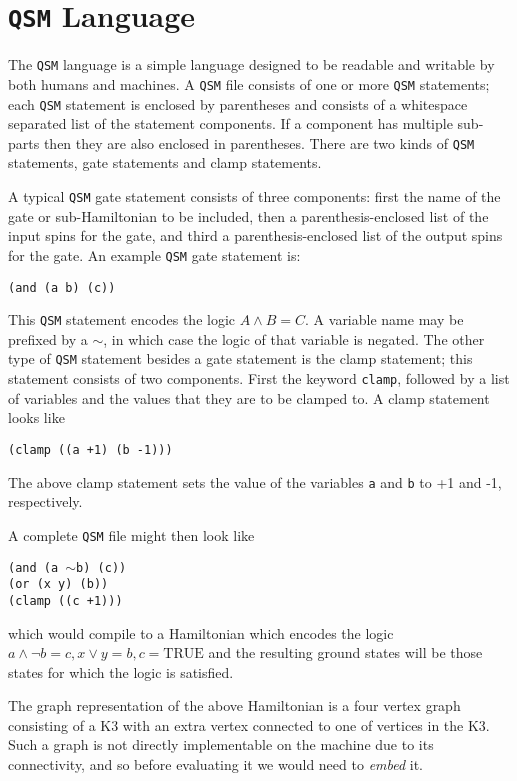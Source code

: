 \section{\texttt{QSM} Language}
The \texttt{QSM} language is a simple language designed to be readable and writable by both humans and machines.  A \texttt{QSM} file consists of one or more \texttt{QSM} statements; each \texttt{QSM} statement is enclosed by parentheses and consists of a whitespace separated list of the statement components.  If a component has multiple sub-parts then they are also enclosed in parentheses.  There are two kinds of \texttt{QSM} statements, gate statements and clamp statements.

A typical \texttt{QSM} gate statement consists of three components: first the name of the gate or sub-Hamiltonian to be included, then a parenthesis-enclosed list of the input spins for the gate, and third a parenthesis-enclosed list of the output spins for the gate.  An example \texttt{QSM} gate statement is: 
\begin{center}
	\texttt{(and (a b) (c))}
\end{center}
This \texttt{QSM} statement encodes the logic $A \wedge B = C$.  A variable name may be prefixed by a $\sim$, in which case the logic of that variable is negated.  The other type of \texttt{QSM} statement besides a gate statement is the clamp statement; this statement consists of two components.  First the keyword \texttt{clamp}, followed by a list of variables and the values that they are to be clamped to.  A clamp statement looks like
\begin{center}
	\texttt{(clamp ((a +1) (b -1)))}
\end{center}
The above clamp statement sets the value of the variables \texttt{a} and \texttt{b} to +1 and -1, respectively.

A complete \texttt{QSM} file might then look like

\begin{center}
	\texttt{(and (a $\sim$b) (c))}\\
	\texttt{(or (x y) (b))}\\
	\texttt{(clamp ((c +1)))}
\end{center}
which would compile to a Hamiltonian which encodes the logic $a \wedge \neg b = c, x \vee y = b, c = \text{TRUE}$ and the resulting ground states will be those states for which the logic is satisfied.

The graph representation of the above Hamiltonian is a four vertex graph consisting of a K3 with an extra vertex connected to one of vertices in the K3.  Such a graph is not directly implementable on the \machine machine due to its connectivity, and so before evaluating it we would need to \emph{embed} it.

